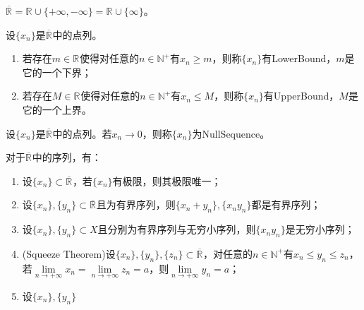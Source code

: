 \begin{definition}
	$\overline{\mathbb{R}^{}}=\mathbb{R}^{}\cup\{+\infty,-\infty\}=\mathbb{R}^{}\cup\{\infty\}$。
\end{definition}
\begin{definition}
	设$\{x_n\}$是$\overline{\mathbb{R}^{}}$中的点列。
	\begin{enumerate}
		\item 若存在$m\in\mathbb{R}^{}$使得对任意的$n\in\mathbb{N}^+$有$x_n\geqslant m$，则称$\{x_n\}$有\gls{LowerBound}，$m$是它的一个下界；
		\item 若存在$M\in\mathbb{R}^{}$使得对任意的$n\in\mathbb{N}^+$有$x_n\leqslant M$，则称$\{x_n\}$有\gls{UpperBound}，$M$是它的一个上界。
	\end{enumerate}
\end{definition}
\begin{definition}
	设$\{x_n\}$是$\overline{\mathbb{R}^{}}$中的点列。若$x_n\to0$，则称$\{x_n\}$为\gls{NullSequence}。
\end{definition}
\begin{property}\label{prop:RSeq}
	对于$\overline{\mathbb{R}^{}}$中的序列，有：
	\begin{enumerate}
		\item 设$\{x_n\}\subset\overline{\mathbb{R}^{}}$，若$\{x_n\}$有极限，则其极限唯一；
		\item 设$\{x_n\},\{y_n\}\subset \overline{\mathbb{R}^{}}$且为有界序列，则$\{x_n+y_n\},\{x_ny_n\}$都是有界序列；
		\item 设$\{x_n\},\{y_n\}\subset X$且分别为有界序列与无穷小序列，则$\{x_ny_n\}$是无穷小序列；
		\item (Squeeze Theorem)设$\{x_n\},\{y_n\},\{z_n\}\subset\overline{\mathbb{R}^{}}$，对任意的$n\in\mathbb{N}^+$有$x_n\leqslant y_n\leqslant z_n$，若$\lim\limits_{n\to+\infty}x_n=\lim\limits_{n\to+\infty}z_n=a$，则$\lim\limits_{n\to+\infty}y_n=a$；
		\item 设$\{x_n\},\{y_n\}$
	\end{enumerate}
\end{property}
